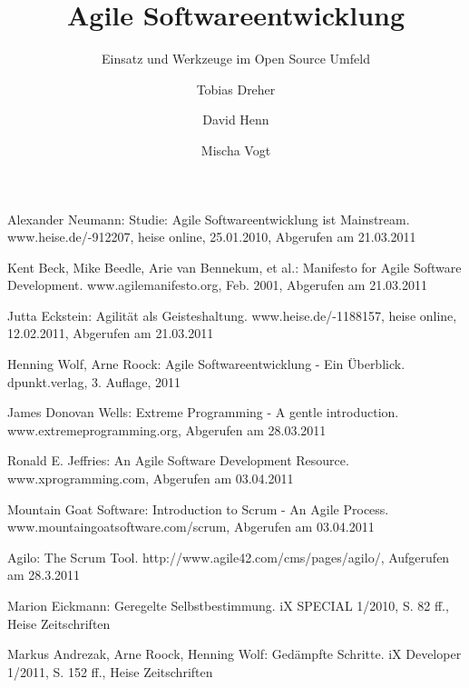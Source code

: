 \documentclass[german,english]{header}
\begin{document}

\title{Agile Softwareentwicklung}
\subtitle{Einsatz und Werkzeuge im Open Source Umfeld}
\author{Tobias Dreher\and David Henn\and Mischa Vogt}

\maketitle







\begin{thebibliography}{5}
Alexander Neumann:
Studie: Agile Softwareentwicklung ist Mainstream.
www.heise.de/-912207, heise online, 25.01.2010, Abgerufen am 21.03.2011

Kent Beck, Mike Beedle, Arie van Bennekum, et al.: 
Manifesto for Agile Software Development.
www.agilemanifesto.org, Feb. 2001, Abgerufen am 21.03.2011

Jutta Eckstein: 
Agilität als Geisteshaltung.
www.heise.de/-1188157, heise online, 12.02.2011, Abgerufen am 21.03.2011

Henning Wolf, Arne Roock: 
Agile Softwareentwicklung - Ein Überblick.\\
dpunkt.verlag, 3. Auflage, 2011

James Donovan Wells: 
Extreme Programming - A gentle introduction.\\
www.extremeprogramming.org, Abgerufen am 28.03.2011

Ronald E. Jeffries: 
An Agile Software Development Resource.\\
www.xprogramming.com, Abgerufen am 03.04.2011

Mountain Goat Software: 
Introduction to Scrum - An Agile Process.\\
www.mountaingoatsoftware.com/scrum, Abgerufen am 03.04.2011

Agilo: The Scrum Tool.
http://www.agile42.com/cms/pages/agilo/,
Aufgerufen am 28.3.2011

Marion Eickmann: 
Geregelte Selbstbestimmung.
iX SPECIAL 1/2010, S. 82 ff., Heise Zeitschriften

Markus Andrezak, Arne Roock, Henning Wolf: 
Gedämpfte Schritte.
iX Developer 1/2011, S. 152 ff., Heise Zeitschriften


\end{thebibliography}
\end{document}
